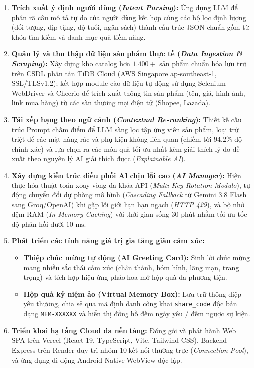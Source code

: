 \begin{enumerate}[leftmargin=1.2cm, itemsep=3pt]
    \item \textbf{Trích xuất ý định người dùng (\textit{Intent Parsing}):} Ứng dụng LLM để phân rã câu mô tả tự do của người dùng kết hợp cùng các bộ lọc định lượng (đối tượng, dịp tặng, độ tuổi, ngân sách) thành cấu trúc JSON chuẩn gồm từ khóa tìm kiếm và danh mục quà tiềm năng.
    
    \item \textbf{Quản lý và thu thập dữ liệu sản phẩm thực tế (\textit{Data Ingestion \& Scraping}):} Xây dựng kho catalog hơn $1.400+$ sản phẩm chuẩn hóa lưu trữ trên CSDL phân tán TiDB Cloud (AWS Singapore ap-southeast-1, SSL/TLSv1.2); kết hợp module cào dữ liệu tự động sử dụng Selenium WebDriver và Cheerio để trích xuất thông tin sản phẩm (tên, giá, hình ảnh, link mua hàng) từ các sàn thương mại điện tử (Shopee, Lazada).
    
    \item \textbf{Tái xếp hạng theo ngữ cảnh (\textit{Contextual Re-ranking}):} Thiết kế cấu trúc Prompt chấm điểm để LLM sàng lọc tập ứng viên sản phẩm, loại trừ triệt để các mặt hàng rác và phụ kiện không liên quan (chiếm tới $94.2\%$ độ chính xác) và lựa chọn ra các món quà tối ưu nhất kèm giải thích lý do đề xuất theo nguyên lý AI giải thích được (\textit{Explainable AI}).
    
    \item \textbf{Xây dựng kiến trúc điều phối AI chịu lỗi cao (\textit{AI Manager}):} Hiện thực hóa thuật toán xoay vòng đa khóa API (\textit{Multi-Key Rotation Modulo}), tự động chuyển đổi dự phòng mô hình (\textit{Cascading Fallback} từ Gemini 3.8 Flash sang Groq/OpenAI) khi gặp lỗi giới hạn hạn ngạch (\textit{HTTP 429}), và bộ nhớ đệm RAM (\textit{In-Memory Caching}) với thời gian sống 30 phút nhằm tối ưu tốc độ phản hồi dưới $10\text{ ms}$.
    
    \item \textbf{Phát triển các tính năng giá trị gia tăng giàu cảm xúc:}
    \begin{itemize}[leftmargin=0.8cm, itemsep=2pt]
        \item \textbf{Thiệp chúc mừng tự động (AI Greeting Card):} Sinh lời chúc mừng mang nhiều sắc thái cảm xúc (chân thành, hóm hỉnh, lãng mạn, trang trọng) và tích hợp hiệu ứng pháo hoa mở hộp quà đa phương tiện.
        \item \textbf{Hộp quà kỷ niệm ảo (Virtual Memory Box):} Lưu trữ thông điệp yêu thương, chia sẻ qua mã định danh công khai \texttt{share\_code} độc bản dạng \texttt{MEM-XXXXXX} và hiển thị đồng hồ đếm ngày yêu / đếm ngược sự kiện.
    \end{itemize}
    
    \item \textbf{Triển khai hạ tầng Cloud đa nền tảng:} Đóng gói và phát hành Web SPA trên Vercel (React 19, TypeScript, Vite, Tailwind CSS), Backend Express trên Render duy trì nhóm 10 kết nối thường trực (\textit{Connection Pool}), và ứng dụng di động Android Native WebView độc lập.
\end{enumerate}

